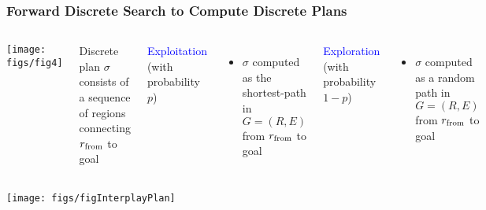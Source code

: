 \documentclass[10pt,t]{beamer}
\begin{document}
\begin{frame}
\frametitle{Forward Discrete Search to Compute Discrete Plans}

\begin{columns}[c]


\texttt{[image: figs/fig4]}



Discrete plan $\sigma$ consists of a sequence of regions connecting
$r_{{{\mathrm{from}}}}$ to goal

\vspace*{3mm}

\textcolor{blue}{Exploitation} (with probability $p$)
\begin{itemize}
\item $\sigma$ computed as the shortest-path in $G=(R,E)$ from $r_{{{\mathrm{from}}}}$ to goal
\end{itemize}

\vspace*{3mm}

\textcolor{blue}{Exploration} (with probability $1 - p$)
\begin{itemize}
\item $\sigma$ computed as a random path in $G=(R,E)$ from $r_{{{\mathrm{from}}}}$ to goal
\end{itemize}

\end{columns}

\vspace*{19mm}
{\hfill{\texttt{[image: figs/figInterplayPlan]}}}

\end{frame}
\end{document}

